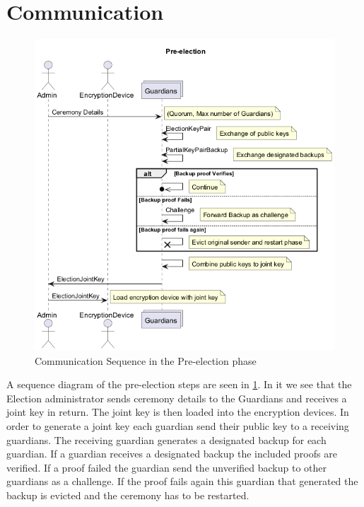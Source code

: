 \section{Communication}
\begin{figure}
    \centering
    \includegraphics[width=\textwidth]{abbildungen/Diagramme/communication-seq0.png}
    \caption{Communication Sequence in the Pre-election phase}
    \label{Fig:comm-pre}
\end{figure}

A sequence diagram of the pre-election steps are seen in \ref{Fig:comm-pre}. In it we see that the Election administrator sends ceremony details to the Guardians and receives a joint key in return. The joint key is then loaded into the encryption devices. In order to generate a joint key each guardian send their public key to a receiving guardians. The receiving guardian generates a designated backup for each guardian. If a guardian receives a designated backup the included proofs are verified. If a proof failed the guardian send the unverified backup to other guardians as a challenge. If the proof fails again this guardian that generated the backup is evicted and the ceremony has to be restarted. 

